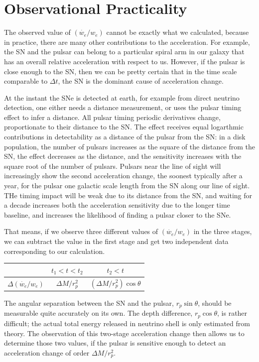 \documentclass[aps,showpacs,twocolumn,floats,prd,superscriptaddress,nofootinbib]{revtex4-1}
\begin{document}
\section{Observational Practicality}
\label{sec-obs}

The observed value of $(\dot{w_e}/w_e)$ cannot be exactly what we calculated, because in practice, there are many other contributions to the acceleration. For example, the SN and the pulsar can belong to a particular spiral arm in our galaxy that has an overall relative acceleration with respect to us. However, if the pulsar is close enough to the SN, then we can be pretty certain that in the time scale comparable to $\Delta t$, the SN is the dominant cause of acceleration change. %

At the instant the SNe is detected at earth, for example from direct neutrino detection, one either needs a distance measurement, or uses the pulsar timing effect to infer a distance.   All pulsar timing periodic derivatives change, proportionate to their distance to the SN.  The effect receives equal logarthmic contributions in detectability as a distance of the pulsar from the SN: in a disk population, the number of pulsars increases as the square of the distance from the SN, the effect decreases as the distance, and the sensitivity increases with the square root of the number of pulsars.  Pulsars near the line of sight will increasingly show the second acceleration change, the soonest typically after a year, for the pulsar one galactic scale length from the SN along our line of sight.  THe timing impact will be weak due to its distance from the SN, and waiting for a decade increases both the acceleration sensitivity due to the longer time baseline, and increases the likelihood of finding a pulsar closer to the SNe. 

That means, if we observe three different values of $(\dot{w_e}/w_e)$ in the three stages, we can subtract the value in the first stage and get two independent data corresponding to our calculation.
\begin{center}
\begin{tabular}{| c | c | c |} 
\hline
                & $t_1<t<t_2$ & $t_2<t$ \\ 
       \hline 
$\Delta(\dot{w_e}/w_e)$ & $ \Delta M/r_p^2$ 
& $(\Delta M/r_p^2)\cos\theta$   \\ 
\hline 
\end{tabular}
\end{center}
The angular separation between the SN and the pulsar, $r_p\sin\theta$, should be measurable quite accurately on its own. The depth difference, $r_p\cos\theta$, is rather difficult; the actual total energy released in neutrino shell is only estimated from theory. The observation of this two-stage acceleration change then allows us to determine those two values, if the pulsar is sensitive enough to detect an acceleration change of order $\Delta M/r_p^2$.
\end{document}

